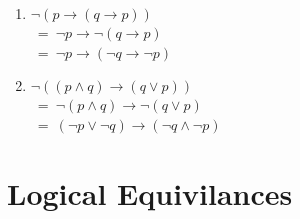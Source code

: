 \documentclass[11pt]{article}
\begin{document}
\begin{enumerate}
\item 
$\neg(p \rightarrow (q \rightarrow p))$\\
~=~$\neg p \rightarrow  \neg(q \rightarrow p)$\\
~=~$\neg p \rightarrow (\neg q \rightarrow \neg p)$\\

\item
$\neg((p \land q) \rightarrow (q \lor p))$\\
~=~$\neg(p \land q) \rightarrow \neg(q \lor p)$\\
~=~$(\neg p \lor \neg q) \rightarrow (\neg q \land \neg p)$\\
\end{enumerate}

\section{Logical Equivilances}
\end{document}
